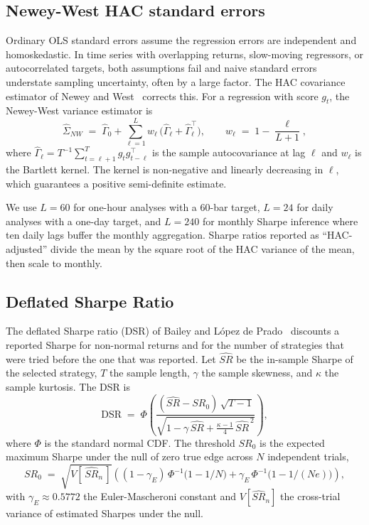 \documentclass[11pt]{article}
\begin{document}
\subsection{Newey-West HAC standard errors}
\label{app:hac}

Ordinary OLS standard errors assume the regression errors are independent and
homoskedastic. In time series with overlapping returns, slow-moving regressors, or
autocorrelated targets, both assumptions fail and naive standard errors understate sampling
uncertainty, often by a large factor. The HAC covariance estimator of
Newey and West~\cite{newey1987hac} corrects this. For a regression with score $g_t$, the
Newey-West variance estimator is
\[
\hat{\Sigma}_{NW} \;=\; \hat{\Gamma}_0 + \sum_{\ell = 1}^{L} w_\ell \, \big( \hat{\Gamma}_\ell + \hat{\Gamma}_\ell^\top \big),
\qquad
w_\ell \;=\; 1 - \frac{\ell}{L+1},
\]
where $\hat{\Gamma}_\ell = T^{-1} \sum_{t = \ell+1}^{T} g_t g_{t-\ell}^\top$ is the sample
autocovariance at lag $\ell$ and $w_\ell$ is the Bartlett kernel. The kernel is
non-negative and linearly decreasing in $\ell$, which guarantees a positive semi-definite
estimate.

We use $L = 60$ for one-hour analyses with a 60-bar target, $L = 24$ for daily analyses
with a one-day target, and $L = 240$ for monthly Sharpe inference where ten daily lags
buffer the monthly aggregation. Sharpe ratios reported as ``HAC-adjusted'' divide the mean
by the square root of the HAC variance of the mean, then scale to monthly.

\subsection{Deflated Sharpe Ratio}
\label{app:dsr}

The deflated Sharpe ratio (DSR) of Bailey and L\'opez de Prado~\cite{bailey2014dsr}
discounts a reported Sharpe for non-normal returns and for the number of strategies that
were tried before the one that was reported. Let $\widehat{SR}$ be the in-sample Sharpe of
the selected strategy, $T$ the sample length, $\gamma$ the sample skewness, and $\kappa$
the sample kurtosis. The DSR is
\[
\mathrm{DSR} \;=\; \Phi\!\left( \frac{ (\widehat{SR} - SR_0) \, \sqrt{T - 1} }
    { \sqrt{1 - \gamma \, \widehat{SR} + \tfrac{\kappa - 1}{4} \, \widehat{SR}^{\,2} } } \right),
\]
where $\Phi$ is the standard normal CDF. The threshold $SR_0$ is the expected maximum
Sharpe under the null of zero true edge across $N$ independent trials,
\[
SR_0 \;=\; \sqrt{V[\,\widehat{SR}_n\,]} \left( (1 - \gamma_E) \, \Phi^{-1}\!\big(1 - 1/N\big)
    + \gamma_E \, \Phi^{-1}\!\big(1 - 1/(N e)\big) \right),
\]
with $\gamma_E \approx 0.5772$ the Euler-Mascheroni constant and $V[\widehat{SR}_n]$ the
cross-trial variance of estimated Sharpes under the null.
\end{document}
